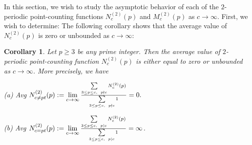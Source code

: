 \documentclass{article}
\theoremstyle{plain}
\newtheorem{cor}[thm]{Corollary}
\theoremstyle{definition}
\begin{document}
In this section, we wish to study the asymptotic behavior of each of the $2$-periodic point-counting functions $N_{c}^{(2)}(p)$ and $M_{c}^{(2)}(p)$ as $c\to \infty$. First, we wish to determine:  The following corollary shows that the average value of $N_{c}^{(2)}(p)$ is zero or unbounded as $c\to \infty$:
\begin{cor}\label{cor5}
Let $p\geq 3$ be any prime integer. Then the average value of $2$-periodic point-counting function $N_{c}^{(2)}(p)$ is either equal to zero or unbounded as $c\to\infty$. \textit{More precisely, we have} 
\begin{myitemize}
    \item[\textnormal{(a)}] \textnormal{Avg} $N_{c \neq pt}^{(2)}(p) := \lim\limits_{c\to\infty} \Large{\frac{\sum\limits_{3\leq p\leq c, \ p\nmid c}N_{c}^{(2)}(p)}{\Large{\sum\limits_{3\leq p\leq c, \ p\nmid c}1}}} = 0.$  
    
    \item[\textnormal{(b)}] \textnormal{Avg} $N_{c = pt}^{(2)}(p):= \lim\limits_{c \to\infty} \Large{\frac{\sum\limits_{3\leq p\leq c, \ p\mid c}N_{c}^{(2)}(p)}{\Large{\sum\limits_{3\leq p\leq c, \ p\mid c}1}}} =  \infty$.    
\end{myitemize}

\end{cor}
\end{document}
